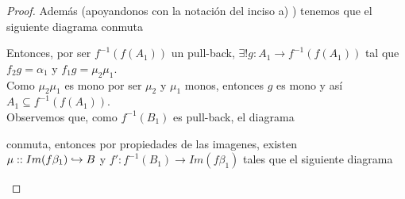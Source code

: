 \documentclass{article}
\begin{document}
\begin{enumerate}[label=\textbf{Ej \arabic*.}]
\begin{proof}
			Además (apoyandonos con la notación del inciso a) ) tenemos que el siguiente diagrama conmuta
			
			\centerline{
				}
			
			Entonces, por ser $f^{-1}(f(A_1))$ un pull-back, $\exists ! g:A_1\to f^{-1}(f(A_1))$ tal que $f_2g=\alpha_1$ y $f_1g=\mu_2\mu_1$.\\
			
			Como $\mu_2\mu_1$ es mono por ser $\mu_2$ y $\mu_1$ monos, entonces $g$ es mono y así $A_1\subseteq f^{-1}(f(A_1))$.\\
			
			 Observemos que, como $f^{-1}(B_1)$ es pull-back, el diagrama\\
			
			\centerline{
				}
			
			conmuta, entonces por propiedades de las imagenes, existen \\
			$\mu:\catarrow{}{Im(f\beta_1)}{B}{m}$ y $f':f^{-1}(B_1)\to Im(f\beta_1)$ tales que el siguiente diagrama\\
			
			\centerline{
				}
			

\end{proof}
\end{enumerate}
\end{document}
